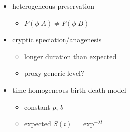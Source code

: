 \documentclass{beamer}
\begin{document}
\begin{frame}
\begin{columns}
\begin{column}{0.5\textwidth}
\begin{center}
        \tiny{}
      \end{center}
    \end{column}
    \begin{column}{0.5\textwidth}
      \begin{itemize}
        \item heterogeneous preservation
          \begin{itemize}
            \item \(P(\phi | A) \neq P(\phi | B)\)
          \end{itemize}
        \item cryptic speciation/anagenesis
          \begin{itemize}
            \item longer duration than expected
            \item proxy generic level?
          \end{itemize}
        \item time-homogeneous birth-death model
          \begin{itemize}
            \item constant \(p\), \(b\)
            \item expected \(S(t) = \exp^{-\lambda t}\)
          \end{itemize}
      \end{itemize}
    \end{column}
  \end{columns}
\end{frame}
\end{document}
